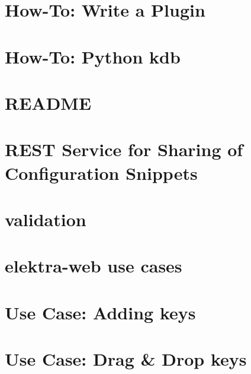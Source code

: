 \documentclass[twoside]{book}
\newcommand{\+}{\discretionary{\mbox{\scriptsize$\hookleftarrow$}}{}{}}
\begin{document}
\chapter{How-\/\+To\+: Write a Plugin}
\label{doc_tutorials_plugins_md}

\chapter{How-\/\+To\+: Python kdb}
\label{doc_tutorials_python-kdb_md}

\chapter{R\+E\+A\+D\+ME}
\label{md_doc_tutorials_README}

\chapter{R\+E\+ST Service for Sharing of Configuration Snippets}
\label{doc_tutorials_snippet-sharing-rest-service_md}

\chapter{validation}
\label{md_doc_tutorials_validation}

\chapter{elektra-\/web use cases}
\label{doc_usecases_elektra_web_README_md}

\chapter{Use Case\+: Adding keys}
\label{doc_usecases_elektra_web_UC_adding_keys_md}

\chapter{Use Case\+: Drag \& Drop keys}
\label{doc_usecases_elektra_web_UC_drag_n_drop_md}

\end{document}
